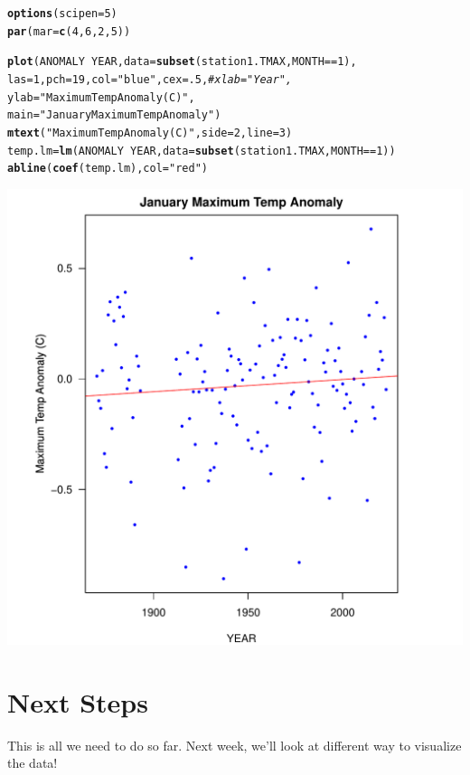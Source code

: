 \documentclass{article}\usepackage[]{graphicx}\usepackage[]{xcolor}
\makeatletter
\def\maxwidth{ %
  \ifdim\Gin@nat@width>\linewidth
    \linewidth
  \else
    \Gin@nat@width
  \fi
}
\newcommand{\hlnum}[1]{\textcolor[rgb]{0.686,0.059,0.569}{#1}}%
\newcommand{\hlstr}[1]{\textcolor[rgb]{0.192,0.494,0.8}{#1}}%
\newcommand{\hlcom}[1]{\textcolor[rgb]{0.678,0.584,0.686}{\textit{#1}}}%
\newcommand{\hlopt}[1]{\textcolor[rgb]{0,0,0}{#1}}%
\newcommand{\hlstd}[1]{\textcolor[rgb]{0.345,0.345,0.345}{#1}}%
\newcommand{\hlkwb}[1]{\textcolor[rgb]{0.69,0.353,0.396}{#1}}%
\newcommand{\hlkwc}[1]{\textcolor[rgb]{0.333,0.667,0.333}{#1}}%
\newcommand{\hlkwd}[1]{\textcolor[rgb]{0.737,0.353,0.396}{\textbf{#1}}}%
\newenvironment{kframe}{%
 \def\at@end@of@kframe{}%
 \ifinner\ifhmode%
  \def\at@end@of@kframe{\end{minipage}}%
  \begin{minipage}{\columnwidth}%
 \fi\fi%
 \def\FrameCommand##1{\hskip\@totalleftmargin \hskip-\fboxsep
 \colorbox{shadecolor}{##1}\hskip-\fboxsep
     \hskip-\linewidth \hskip-\@totalleftmargin \hskip\columnwidth}%
 \MakeFramed {\advance\hsize-\width
   \@totalleftmargin\z@ \linewidth\hsize
   \@setminipage}}%
 {\par\unskip\endMakeFramed%
 \at@end@of@kframe}
\newenvironment{knitrout}{}{} %
\makeatother
\begin{document}
\begin{knitrout}
\color{fgcolor}\begin{kframe}
\begin{alltt}
\hlkwd{options}\hlstd{(}\hlkwc{scipen}\hlstd{=}\hlnum{5}\hlstd{)}
\hlkwd{par}\hlstd{(}\hlkwc{mar}\hlstd{=}\hlkwd{c}\hlstd{(}\hlnum{4}\hlstd{,}\hlnum{6}\hlstd{,}\hlnum{2}\hlstd{,}\hlnum{5}\hlstd{))}

\hlkwd{plot}\hlstd{(ANOMALY} \hlopt{~} \hlstd{YEAR,} \hlkwc{data} \hlstd{=} \hlkwd{subset}\hlstd{(station1.TMAX, MONTH} \hlopt{==} \hlnum{1}\hlstd{),}
     \hlkwc{las}\hlstd{=}\hlnum{1}\hlstd{,} \hlkwc{pch}\hlstd{=}\hlnum{19}\hlstd{,} \hlkwc{col} \hlstd{=} \hlstr{"blue"}\hlstd{,} \hlkwc{cex}\hlstd{=}\hlnum{.5}\hlstd{,} \hlcom{#xlab = "Year", }
     \hlkwc{ylab} \hlstd{=} \hlstr{"Maximum Temp Anomaly (C)"}\hlstd{,}
     \hlkwc{main}\hlstd{=}\hlstr{"January Maximum Temp Anomaly"}\hlstd{)}
\hlkwd{mtext}\hlstd{(}\hlstr{"Maximum Temp Anomaly (C)"}\hlstd{,} \hlkwc{side} \hlstd{=} \hlnum{2}\hlstd{,} \hlkwc{line} \hlstd{=} \hlnum{3}\hlstd{)}
\hlstd{temp.lm} \hlkwb{=} \hlkwd{lm}\hlstd{(ANOMALY} \hlopt{~} \hlstd{YEAR,} \hlkwc{data} \hlstd{=} \hlkwd{subset}\hlstd{(station1.TMAX, MONTH} \hlopt{==} \hlnum{1}\hlstd{))}
\hlkwd{abline}\hlstd{(}\hlkwd{coef}\hlstd{(temp.lm),} \hlkwc{col} \hlstd{=} \hlstr{"red"}\hlstd{)}
\end{alltt}
\end{kframe}
\includegraphics[width=\maxwidth]{figure/unnamed-chunk-10-1} 
\end{knitrout}


\section{Next Steps}

This is all we need to do so far. Next week, we'll look at different way to visualize the data!
\end{document}
